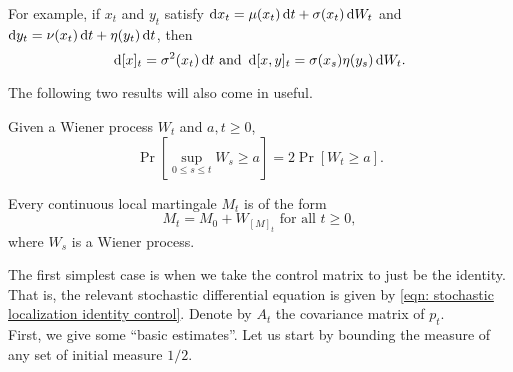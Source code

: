 		For example, if $x_t$ and $y_t$ satisfy $\operatorname{d}\!{x}_t = \mu(x_t) \operatorname{d}\!{t} + \sigma(x_t)\operatorname{d}\!{W}_t$ and $\operatorname{d}\!{y}_t = \nu(x_t) \operatorname{d}\!{t} + \eta(y_t) \operatorname{d}\!{t}$, then
		\[ \operatorname{d}\!{[x]_t} = \sigma^2(x_t) \operatorname{d}\!{t} \text{ and } \operatorname{d}\!{[x,y]_t} = \sigma(x_s)\eta(y_s) \operatorname{d}\!{W_t}. \]

		The following two results will also come in useful.

		\begin{lemma}
			\label{reflection principle}
			Given a Wiener process $W_t$ and $a,t\geq 0$,
			\[ \Pr\left[\sup_{0 \leq s \leq t} W_s \geq a\right] = 2 \Pr\left[W_t \geq a\right]. \]
		\end{lemma}

		\begin{theorem}
			\label{Dambis Dubins Schwarz Th}
			Every continuous local martingale $M_t$ is of the form
			\[ M_t = M_0 + W_{[M]_t} \text{ for all } t \geq 0, \]
			where $W_s$ is a Wiener process.
		\end{theorem}

		The first simplest case is when we take the control matrix to just be the identity. That is, the relevant stochastic differential equation is given by \eqref{eqn: stochastic localization identity control}. Denote by $A_t$ the covariance matrix of $p_t$.\\


		First, we give some ``basic estimates''. Let us start by bounding the measure of any set of initial measure $1/2$.


